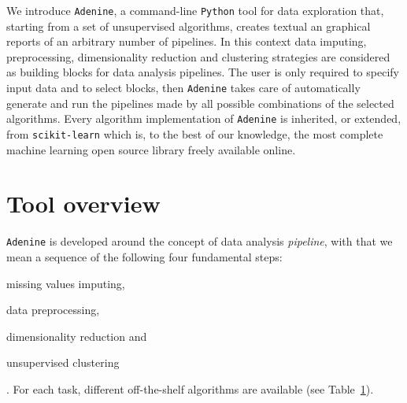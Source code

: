 \documentclass[twoside,11pt]{article}
\makeatletter
\newcommand{\ade}{\texttt{Adenine}\@\xspace}
\newcommand{\py}{\texttt{Python}\@\xspace}
\makeatother
\begin{document}
We introduce \ade, a command-line \py tool for data exploration that, starting from a set of unsupervised algorithms, creates textual an graphical reports of an arbitrary number of pipelines. In this context data imputing, preprocessing, dimensionality reduction and clustering strategies are considered as building blocks for data analysis pipelines. The user is only required to specify input data and to select blocks, then \ade takes care of automatically generate and run the pipelines made by all possible combinations of the selected algorithms. Every algorithm implementation of \ade is inherited, or extended, from \texttt{scikit-learn} \citep{scikit-learn} which is, to the best of our knowledge, the most complete machine learning open source library freely available online.


\section{Tool overview}\label{sec:implem}
\ade is developed around the concept of data analysis \emph{pipeline}, with that we mean a sequence of the following four fundamental steps:
\begin{enumerate*}[label=(\roman*)]
  \item missing values imputing,
  \item data preprocessing,
  \item dimensionality reduction and
  \item unsupervised clustering
\end{enumerate*}. 
For each task, different off-the-shelf algorithms are available (see Table~\ref{sec:implem}).%



\end{document}
